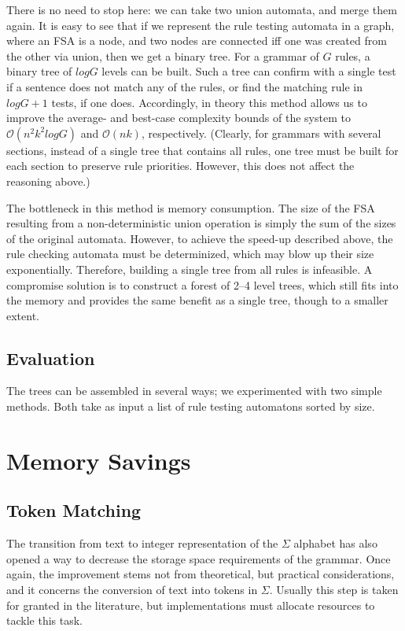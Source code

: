 \documentclass{article}
\begin{document}
There is no need to stop here: we can take two union automata, and merge them
again. It is easy to see that if we represent the rule testing automata in a
graph, where an FSA is a node, and two nodes are connected iff one was created
from the other via union, then we get a binary tree. For a grammar of $G$ rules,
a binary tree of $logG$ levels can be built. Such a tree can confirm with a
single test if a sentence does not match any of the rules, or find the matching
rule in $logG + 1$ tests, if one does. Accordingly, in theory this method
allows us to improve the average- and best-case complexity bounds of the system
to $\mathcal{O}(n^2k^2logG)$ and $\mathcal{O}(nk)$, respectively.  %
(Clearly, for grammars with several sections, instead of a single tree that
contains all rules, one tree must be built for each section to preserve rule
priorities. However, this does not affect the reasoning above.)  %

The bottleneck in this method is memory consumption. The size of the FSA
resulting from a non-deterministic union operation is simply the sum of the
sizes of the original automata. However, to achieve the speed-up described above,
the rule checking automata must be determinized, which may blow up their size
exponentially. Therefore, building a single tree from all rules is infeasible.
A compromise solution is to construct a forest of 2--4 level trees, which still
fits into the memory and provides the same benefit as a single tree, though to
a smaller extent.

\subsection{Evaluation}

The trees can be assembled in several ways; we experimented with two simple
methods. Both take as input a list of rule testing automatons sorted by size.

\section{Memory Savings}
\label{sec:memory}


\subsection{Token Matching}
\label{sec:sub_token}

The transition from text to integer representation of the $\Sigma$ alphabet
has also opened a way to decrease the storage space requirements of the grammar.
Once again, the improvement stems not from theoretical, but practical
considerations, and it concerns the conversion of text into tokens in $\Sigma$.
Usually this step is taken for granted in the literature, but implementations
must allocate resources to tackle this task.  %
\end{document}
